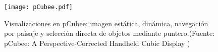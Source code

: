 \begin{figure}[!h]
\begin{center}
\texttt{[image: pCubee.pdf]}
\caption{Visualizaciones en pCubee: imagen estática, dinámica, navegación por paisaje y selección directa de objetos mediante puntero.(Fuente: pCubee: A Perspective-Corrected Handheld Cubic Display \cite{pCubee})}
\label{fig:pCubee}
\end{center}
\end{figure}





